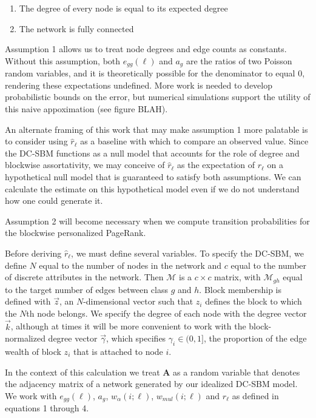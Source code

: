 \documentclass[12pt]{article}
\begin{document}
\begin{enumerate}
  \item The degree of every node is equal to its expected degree
  \item The network is fully connected
\end{enumerate}

Assumption 1 allows us to treat node degrees and edge counts as constants.  Without this assumption, both $e_{gg}(\ell)$ and $a_g$ are the ratios of two Poisson random variables, and it is theoretically possible for the denominator to equal 0, rendering these expectations undefined.  More work is needed to develop probabilistic bounds on the error, but numerical simulations support the utility of this naive appoximation (see figure BLAH).

An alternate framing of this work that may make assumption 1 more palatable is to consider using $\hat{r}_\ell$ as a baseline with which to compare an observed value.  Since the DC-SBM functions as a null model that accounts for the role of degree and blockwise assortativity, we may conceive of $\hat{r}_\ell$ as the expectation of $r_\ell$ on a hypothetical null model that is guaranteed to satisfy both assumptions.  We can calculate the estimate on this hypothetical model even if we do not understand how one could generate it.

Assumption 2 will become necessary when we compute transition probabilities for the blockwise personalized PageRank. 

Before deriving $\hat{r}_\ell$, we must define several variables.  To specify the DC-SBM, we define $N$ equal to the number of nodes in the network and $c$ equal to the number of discrete attributes in the network.  Then $\mathcal{M}$ is a $c \times c$ matrix, with $\mathcal{M}_{gh}$ equal to the target number of edges between class $g$ and $h$.  Block membership is defined with $\vec{z}$, an $N$-dimensional vector such that $z_i$ defines the block to which the $N$th node belongs.  We specify the degree of each node with the degree vector $\vec{k}$, although at times it will be more convenient to work with the block-normalized degree vector $\vec{\gamma}$, which specifies $\gamma_i \in (0, 1]$, the proportion of the edge wealth of block $z_i$ that is attached to node $i$.  \cite{clauset:2021}

In the context of this calculation we treat $\mathbf{A}$ as a random variable that denotes the adjacency matrix of a network generated by our idealized DC-SBM model.  We work with $e_{gg}(\ell)$, $a_g$, $w_\alpha(i; \ell)$, $w_{mul}(i; \ell)$ and $r_\ell$ as defined in equations 1 through 4.
\end{document}

